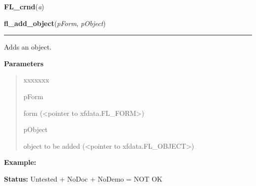     \label{xformslib:library:FL_crnd}

    \vspace{0.5ex}

\hspace{.8\funcindent}\begin{boxedminipage}{\funcwidth}

    \raggedright \textbf{FL\_crnd}(\textit{a})

\setlength{\parskip}{2ex}
\setlength{\parskip}{1ex}
    \end{boxedminipage}

    \label{xformslib:library:fl_add_object}

    \vspace{0.5ex}

\hspace{.8\funcindent}\begin{boxedminipage}{\funcwidth}

    \raggedright \textbf{fl\_add\_object}(\textit{pForm}, \textit{pObject})

    \vspace{-1.5ex}

    \rule{\textwidth}{0.5\fboxrule}
\setlength{\parskip}{2ex}
    Adds an object.

\setlength{\parskip}{1ex}
      \textbf{Parameters}
      \vspace{-1ex}

      \begin{quote}
        \begin{Ventry}{xxxxxxx}

          \item[pForm]

          form ({\textless}pointer to xfdata.FL\_FORM{\textgreater})

          \item[pObject]

          object to be added ({\textless}pointer to 
          xfdata.FL\_OBJECT{\textgreater})

        \end{Ventry}

      \end{quote}

\textbf{Example:} 

\textbf{Status:} Untested + NoDoc + NoDemo = NOT OK



    \end{boxedminipage}

